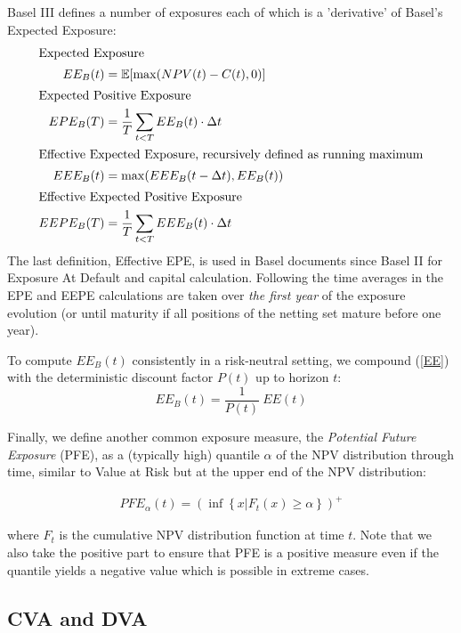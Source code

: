 \documentclass[12pt, a4paper]{article}
\newcommand\E{\ensuremath{\mathbb{E}}}
\newcommand{\PFE}{\mathit{PFE}}
\newcommand{\EE}{\mathit{EE}}
\begin{document}
\begin{appendix}
\medskip
Basel III defines a number of exposures each of which is a 'derivative' of Basel's Expected Exposure:
\begin{align}
\intertext{Expected Exposure}
EE_B(t) &= \E[\max(NPV(t) - C(t), 0)] \label{basel_ee}\\
\intertext{Expected Positive Exposure}
EPE_B(T) &= \frac{1}{T} \sum_{t<T} EE_B(t)\cdot \Delta t  \label{basel_epe} \\
\intertext{Effective Expected Exposure, recursively defined as running maximum}
EEE_B(t) &= \max(EEE_B(t-\Delta t), EE_B(t)) \label{basel_eee}\\
\intertext{Effective Expected Positive Exposure}
EEPE_B(T) &= \frac{1}{T} \sum_{t<T} EEE_B(t)\cdot \Delta t \label{basel_eepe}
\end{align}
The last definition, Effective EPE, is used in Basel documents since Basel II for Exposure At Default and capital
calculation. Following \cite{bcbs128,bcbs189} the time averages in the EPE and EEPE calculations are taken over {\em the
  first year} of the exposure evolution (or until maturity if all positions of the netting set mature before one year).

\medskip
To compute $EE_B(t)$ consistently in a risk-neutral setting, we compound (\ref{EE}) with the deterministic discount factor $P(t)$ up to horizon $t$:
$$
EE_B(t) = \frac{1}{P(t)} \:\EE(t)
$$

Finally, we define another common exposure measure, the {\em Potential Future Exposure} (PFE), as a (typically high)
quantile $\alpha$ of the NPV distribution through time, similar to Value at Risk but at the upper end of the NPV
distribution:

\begin{align}
  \PFE_\alpha(t) = \left(\inf\left\{ x | F_t(x) \geq \alpha\right\}\right)^+ \label{PFE}
\end{align}

where $F_t$ is the cumulative NPV distribution function at time $t$. Note that we also take the positive part to ensure
that PFE is a positive measure even if the quantile yields a negative value which is possible in extreme cases.
 
\subsection{CVA and DVA}\label{sec:app_cvadva}


\end{appendix}
\end{document}
